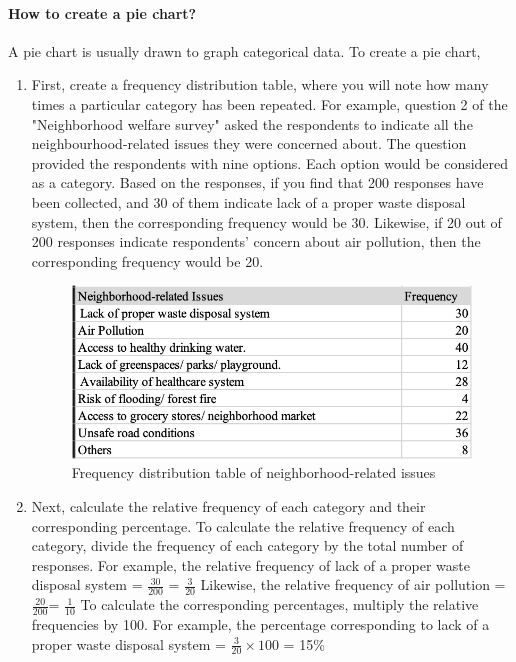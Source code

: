 \documentclass[a4paper, 11pt]{article}
\begin{document}
    \paragraph{How to create a pie chart?}
    A pie chart is usually drawn to graph categorical data. To create a pie chart,
    \begin{enumerate}[label=(\alph*), noitemsep]
			\item
    First, create a frequency distribution table, where you will note how many times a particular category has been repeated. For example, question 2 of the "Neighborhood welfare survey" asked the respondents to indicate all the neighbourhood-related issues they were concerned about. The question provided the respondents with nine options. Each option would be considered as a category. Based on the responses, if you find that 200 responses have been collected, and 30 of them indicate lack of a proper waste disposal system, then the corresponding frequency would be 30. Likewise, if 20 out of 200 responses indicate respondents' concern about air pollution, then the corresponding frequency would be 20. 
    \begin{figure}[h!]
	\centering
	\includegraphics[width=\linewidth]{Freq_dist.jpg}
		\caption{Frequency distribution table of neighborhood-related issues} 
	\end{figure}
   \item
   Next, calculate the relative frequency of each category and their corresponding percentage. To calculate the relative frequency of each category, divide the frequency of each category by the total number of responses. For example, the relative frequency of lack of a proper waste disposal system = $\frac{30}{200}$ = $\frac{3}{20}$
   Likewise, the relative frequency of air pollution = $\frac{20}{200}$= $\frac{1}{10}$
   To calculate the corresponding percentages, multiply the relative frequencies by 100. For example, the percentage corresponding to lack of a proper waste disposal system = $\frac{3}{20}\times100$ = 15\%\\[1ex] 

\end{enumerate}
\end{document}
